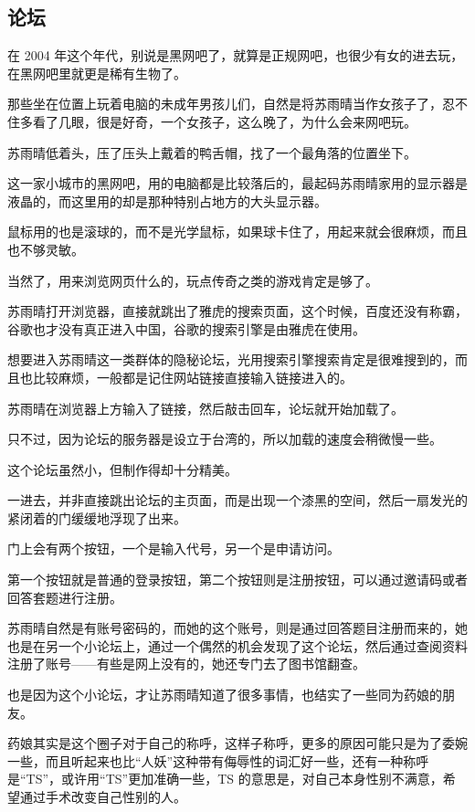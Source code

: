 \subsection{论坛}

在 2004 年这个年代，别说是黑网吧了，就算是正规网吧，也很少有女的进去玩，在黑网吧里就更是稀有生物了。

那些坐在位置上玩着电脑的未成年男孩儿们，自然是将苏雨晴当作女孩子了，忍不住多看了几眼，很是好奇，一个女孩子，这么晚了，为什么会来网吧玩。

苏雨晴低着头，压了压头上戴着的鸭舌帽，找了一个最角落的位置坐下。

这一家小城市的黑网吧，用的电脑都是比较落后的，最起码苏雨晴家用的显示器是液晶的，而这里用的却是那种特别占地方的大头显示器。

鼠标用的也是滚球的，而不是光学鼠标，如果球卡住了，用起来就会很麻烦，而且也不够灵敏。

当然了，用来浏览网页什么的，玩点传奇之类的游戏肯定是够了。

苏雨晴打开浏览器，直接就跳出了雅虎的搜索页面，这个时候，百度还没有称霸，谷歌也才没有真正进入中国，谷歌的搜索引擎是由雅虎在使用。

想要进入苏雨晴这一类群体的隐秘论坛，光用搜索引擎搜索肯定是很难搜到的，而且也比较麻烦，一般都是记住网站链接直接输入链接进入的。

苏雨晴在浏览器上方输入了链接，然后敲击回车，论坛就开始加载了。

只不过，因为论坛的服务器是设立于台湾的，所以加载的速度会稍微慢一些。

这个论坛虽然小，但制作得却十分精美。

一进去，并非直接跳出论坛的主页面，而是出现一个漆黑的空间，然后一扇发光的紧闭着的门缓缓地浮现了出来。

门上会有两个按钮，一个是输入代号，另一个是申请访问。

第一个按钮就是普通的登录按钮，第二个按钮则是注册按钮，可以通过邀请码或者回答套题进行注册。

苏雨晴自然是有账号密码的，而她的这个账号，则是通过回答题目注册而来的，她也是在另一个小论坛上，通过一个偶然的机会发现了这个论坛，然后通过查阅资料注册了账号——有些是网上没有的，她还专门去了图书馆翻查。

也是因为这个小论坛，才让苏雨晴知道了很多事情，也结实了一些同为药娘的朋友。

药娘其实是这个圈子对于自己的称呼，这样子称呼，更多的原因可能只是为了委婉一些，而且听起来也比“人妖”这种带有侮辱性的词汇好一些，还有一种称呼是“TS”，或许用“TS”更加准确一些，TS 的意思是，对自己本身性别不满意，希望通过手术改变自己性别的人。

